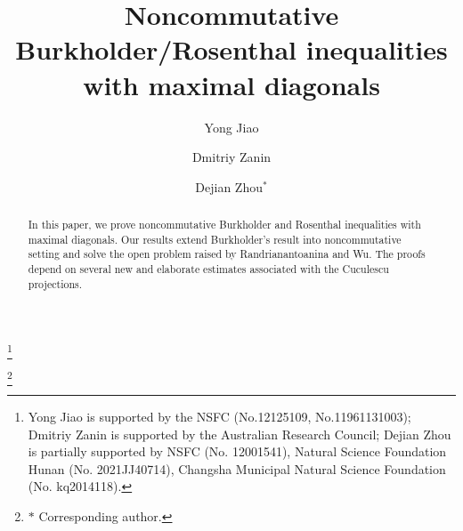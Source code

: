 \documentclass[12pt]{amsart}
\numberwithin{equation}{section}
\begin{document}
\title[Noncommutative Burkholder/Rosenthal inequalities]{Noncommutative Burkholder/Rosenthal inequalities with maximal diagonals}
\author[Jiao]{Yong Jiao  }
\address{School of Mathematics and Statistics, Central South University, HNP-LAMA, Changsha 410075, China}

\author[Zanin]{Dmitriy  Zanin}
\address{School of Mathematics and Statistics, University of NSW, Sydney,  2052, Australia}

\author[Zhou]{Dejian Zhou$^*$}
\address{School of Mathematics and Statistics, HNP-LAMA, Central South University, Changsha 410075, China}



\thanks{Yong Jiao is supported by the NSFC (No.12125109, No.11961131003); Dmitriy Zanin is supported by the Australian Research Council; Dejian Zhou is   partially supported by NSFC (No. 12001541),  Natural Science Foundation Hunan (No. 2021JJ40714), Changsha Municipal Natural Science Foundation (No. kq2014118).}

\thanks{$*$ Corresponding author.}
\begin{abstract}
	In this paper,  we prove noncommutative Burkholder and Rosenthal inequalities with maximal diagonals.
Our results extend Burkholder's result into noncommutative setting and solve the open problem raised by Randrianantoanina and Wu. The proofs depend on several new and elaborate estimates associated with the Cuculescu projections.
\end{abstract}

\maketitle



\printbibliography
\end{document}
